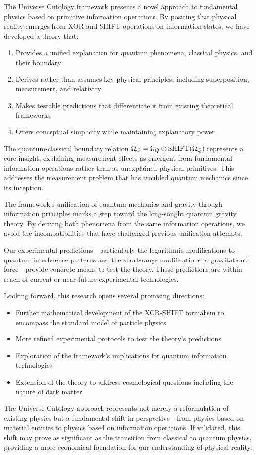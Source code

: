 The Universe Ontology framework presents a novel approach to fundamental physics based on primitive information operations. By positing that physical reality emerges from XOR and SHIFT operations on information states, we have developed a theory that:

\begin{enumerate}
    \item Provides a unified explanation for quantum phenomena, classical physics, and their boundary
    \item Derives rather than assumes key physical principles, including superposition, measurement, and relativity
    \item Makes testable predictions that differentiate it from existing theoretical frameworks
    \item Offers conceptual simplicity while maintaining explanatory power
\end{enumerate}

The quantum-classical boundary relation $\Omega_C = \Omega_Q \oplus \text{SHIFT}(\Omega_Q)$ represents a core insight, explaining measurement effects as emergent from fundamental information operations rather than as unexplained physical primitives. This addresses the measurement problem that has troubled quantum mechanics since its inception.

The framework's unification of quantum mechanics and gravity through information principles marks a step toward the long-sought quantum gravity theory. By deriving both phenomena from the same information operations, we avoid the incompatibilities that have challenged previous unification attempts.

Our experimental predictions—particularly the logarithmic modifications to quantum interference patterns and the short-range modifications to gravitational force—provide concrete means to test the theory. These predictions are within reach of current or near-future experimental technologies.

Looking forward, this research opens several promising directions:

\begin{itemize}
    \item Further mathematical development of the XOR-SHIFT formalism to encompass the standard model of particle physics
    \item More refined experimental protocols to test the theory's predictions
    \item Exploration of the framework's implications for quantum information technologies
    \item Extension of the theory to address cosmological questions including the nature of dark matter
\end{itemize}

The Universe Ontology approach represents not merely a reformulation of existing physics but a fundamental shift in perspective—from physics based on material entities to physics based on information operations. If validated, this shift may prove as significant as the transition from classical to quantum physics, providing a more economical foundation for our understanding of physical reality.
